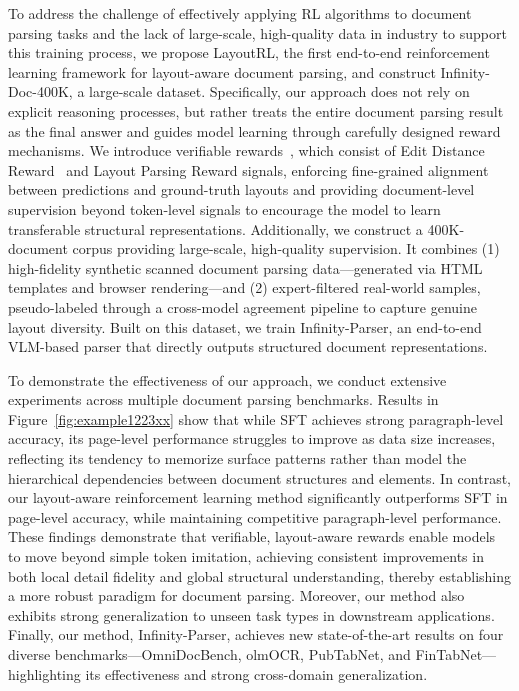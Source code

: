 To address the challenge of effectively applying RL algorithms to document parsing tasks and the lack of large-scale, high-quality data in industry to support this training process, we propose LayoutRL, the first end-to-end reinforcement learning framework for layout-aware document parsing, and construct Infinity-Doc-400K, a large-scale dataset. Specifically, our approach does not rely on explicit reasoning processes, but rather treats the entire document parsing result as the final answer and guides model learning through carefully designed reward mechanisms. We introduce verifiable rewards~\citep{shen2025vlm,liu2024deepseek,shao2024deepseekmath,zheng2025easyr1}, which consist of Edit Distance Reward~\citep{levenshtein1966binary} and Layout Parsing Reward signals, enforcing fine-grained alignment between predictions and ground-truth layouts and providing document-level supervision beyond token-level signals to encourage the model to learn transferable structural representations. Additionally, we construct a 400K-document corpus providing large-scale, high-quality supervision. It combines (1) high-fidelity synthetic scanned document parsing data—generated via HTML templates and browser rendering—and (2) expert-filtered real-world samples, pseudo-labeled through a cross-model agreement pipeline to capture genuine layout diversity. Built on this dataset, we train Infinity-Parser, an end-to-end VLM-based parser that directly outputs structured document representations.


To demonstrate the effectiveness of our approach, we conduct extensive experiments across multiple document parsing benchmarks. Results in Figure~\ref{fig:example1223xx} show that while SFT achieves strong paragraph-level accuracy, its page-level performance struggles to improve as data size increases, reflecting its tendency to memorize surface patterns rather than model the hierarchical dependencies between document structures and elements. In contrast, our layout-aware reinforcement learning method significantly outperforms SFT in page-level accuracy, while maintaining competitive paragraph-level performance. %
These findings demonstrate that verifiable, layout-aware rewards enable models to move beyond simple token imitation, achieving consistent improvements in both local detail fidelity and global structural understanding, thereby establishing a more robust paradigm for document parsing. Moreover, our method also exhibits strong generalization to unseen task types in downstream applications. Finally, our method, Infinity-Parser, achieves new state-of-the-art results on four diverse benchmarks—OmniDocBench, olmOCR, PubTabNet, and FinTabNet—highlighting its effectiveness and strong cross-domain generalization.


